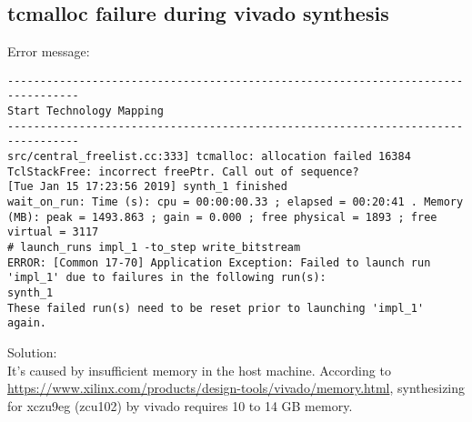\documentclass[a4paper,11pt]{article}
\begin{document}
\subsection{tcmalloc failure during vivado synthesis}
Error message:
\begin{lstlisting}
---------------------------------------------------------------------------------
Start Technology Mapping
---------------------------------------------------------------------------------
src/central_freelist.cc:333] tcmalloc: allocation failed 16384 
TclStackFree: incorrect freePtr. Call out of sequence?
[Tue Jan 15 17:23:56 2019] synth_1 finished
wait_on_run: Time (s): cpu = 00:00:00.33 ; elapsed = 00:20:41 . Memory (MB): peak = 1493.863 ; gain = 0.000 ; free physical = 1893 ; free virtual = 3117
# launch_runs impl_1 -to_step write_bitstream
ERROR: [Common 17-70] Application Exception: Failed to launch run 'impl_1' due to failures in the following run(s):
synth_1
These failed run(s) need to be reset prior to launching 'impl_1' again.
\end{lstlisting}

Solution:\\
It's caused by insufficient memory in the host machine.
According to \url{https://www.xilinx.com/products/design-tools/vivado/memory.html}, synthesizing for xczu9eg (zcu102) by vivado requires 10 to 14 GB memory.  
\end{document}
